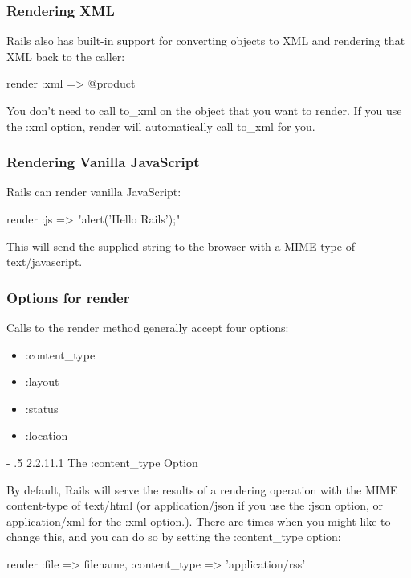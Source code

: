 \documentclass[10pt]{book}
\makeatletter
\renewcommand\paragraph{%
   \@startsection{paragraph}{4}{0mm}%
      {-\baselineskip}%
      {.5\baselineskip}%
      {\normalfont\scriptsize\bfseries}}
\newenvironment{code}{%
  \scriptsize
    \verbatim
}{%
    \endverbatim
    \newline
}
\makeatother
\begin{document}
\subsubsection{ Rendering XML}

Rails also has built-in support for converting objects to XML and rendering that XML back to the caller:
\begin{code}
render :xml => @product
\end{code}

You don’t need to call to\_xml on the object that you want to render. If you use the :xml option, render will automatically call to\_xml for you.

\subsubsection{ Rendering Vanilla JavaScript}

Rails can render vanilla JavaScript:
\begin{code}
render :js => "alert('Hello Rails');"
\end{code}

This will send the supplied string to the browser with a MIME type of text/javascript.

\subsubsection{ Options for render}

Calls to the render method generally accept four options:
\begin{itemize}
	\item :content\_type
	\item :layout
	\item :status
	\item :location
\end{itemize}

\paragraph{2.2.11.1 The :content\_type Option}

By default, Rails will serve the results of a rendering operation with the MIME content-type of text/html (or application/json if you use the :json option, or application/xml for the :xml option.). There are times when you might like to change this, and you can do so by setting the :content\_type option:
\begin{code}
render :file => filename, :content_type => 'application/rss'
\end{code}
\end{document}

